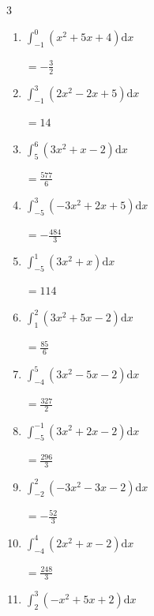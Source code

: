 \begin{multicols}{3}
\begin{enumerate}
        $\displaystyle =-\frac{485}{6}$

  \item $\displaystyle \int_{-1}^{0}\left( x^{2}+5x+4 \right) \mathrm{d}x$

        $\displaystyle =-\frac{3}{2}$

  \item $\displaystyle \int_{-1}^{3}\left( 2x^{2}-2x+5 \right) \mathrm{d}x$

        $\displaystyle =14$

  \item $\displaystyle \int_{5}^{6}\left( 3x^{2}+x-2 \right) \mathrm{d}x$

        $\displaystyle =\frac{577}{6}$

\columnbreak %

\resetques

  \item $\displaystyle \int_{-5}^{3}\left( -3x^{2}+2x+5 \right) \mathrm{d}x$

        $\displaystyle =-\frac{484}{3}$

  \item $\displaystyle \int_{-5}^{1}\left( 3x^{2}+x \right) \mathrm{d}x$

        $\displaystyle =114$

  \item $\displaystyle \int_{1}^{2}\left( 3x^{2}+5x-2 \right) \mathrm{d}x$

        $\displaystyle =\frac{85}{6}$

  \item $\displaystyle \int_{-4}^{5}\left( 3x^{2}-5x-2 \right) \mathrm{d}x$

        $\displaystyle =\frac{327}{2}$

  \item $\displaystyle \int_{-5}^{-1}\left( 3x^{2}+2x-2 \right) \mathrm{d}x$

        $\displaystyle =\frac{296}{3}$

\columnbreak %

  \item $\displaystyle \int_{-2}^{2}\left( -3x^{2}-3x-2 \right) \mathrm{d}x$

        $\displaystyle =-\frac{52}{3}$

  \item $\displaystyle \int_{-4}^{4}\left( 2x^{2}+x-2 \right) \mathrm{d}x$

        $\displaystyle =\frac{248}{3}$

  \item $\displaystyle \int_{2}^{3}\left( -x^{2}+5x+2 \right) \mathrm{d}x$


\end{enumerate}
\end{multicols}
